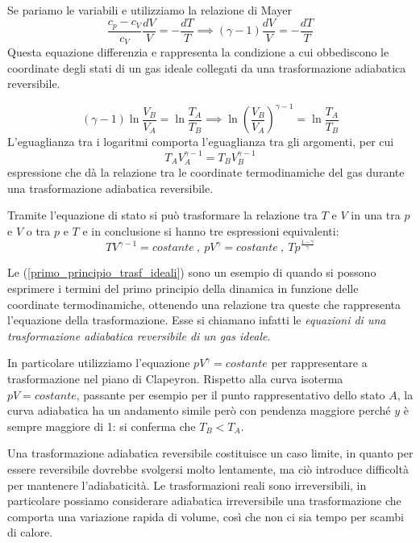 \documentclass[class=book, crop=false, oneside, 12pt]{standalone}
\begin{document}
Se pariamo le variabili e utilizziamo la relazione di Mayer
\begin{equation*}
    \frac{c_p -c_V}{c_V} \frac{d V}{V} = - \frac{d T}{T} \implies (\gamma - 1) \frac{d V}{V} = - \frac{d T}{T}
\end{equation*}
Questa equazione differenzia e rappresenta la condizione a cui obbediscono le coordinate degli stati di un gas ideale collegati da una trasformazione adiabatica reversibile.

\begin{equation*}
    (\gamma - 1) \ln \frac{V_{B}}{V_A} = \ln \frac{T_A}{T_B} \implies \ln \left(\frac{V_B}{V_A}\right)^{\gamma - 1 } = \ln \frac{T_A}{T_B}
\end{equation*}
L'eguaglianza tra i logaritmi comporta l'eguaglianza tra gli argomenti, per cui
\begin{equation*}
    T_A V_A^{\gamma - 1} = T_B V_B^{\gamma - 1}
\end{equation*}
espressione che dà la relazione tra le coordinate termodinamiche del gas durante una trasformazione adiabatica reversibile. 

Tramite l'equazione di stato si può trasformare la relazione tra \(T\) e \(V\) in una tra \(p\) e \(V\) o tra \(p\) e \(T\) e in conclusione si hanno tre espressioni equivalenti:
\begin{equation}
    T V^{\gamma - 1 } = costante \ , \ pV^{\gamma} = costante \ , \ T p^{\frac{1 - \gamma}{\gamma}}
\end{equation}

Le (\ref{primo_principio_trasf_ideali}) sono un esempio di quando si possono esprimere i termini del primo principio della dinamica in funzione delle coordinate termodinamiche, ottenendo una relazione tra queste che rappresenta l'equazione della trasformazione.
Esse si chiamano infatti le \emph{equazioni di una trasformazione adiabatica reversibile di un gas ideale}.

In particolare utilizziamo l'equazione \(p V^{\gamma} = costante\) per rappresentare a trasformazione nel piano di Clapeyron. 
Rispetto alla curva isoterma \(p V = costante\), passante per esempio per il punto rappresentativo dello stato \(A\), la curva adiabatica ha un andamento simile però con pendenza maggiore perché \(y\) è sempre maggiore di 1:  si conferma che \(T_B < T_A\).

Una trasformazione adiabatica reversibile costituisce un caso limite, in quanto per essere reversibile dovrebbe svolgersi molto lentamente, ma ciò introduce difficoltà per mantenere l'adiabaticità. 
Le trasformazioni reali sono irreversibili, in particolare possiamo considerare adiabatica irreversibile una trasformazione che comporta una variazione rapida di volume, così che non ci sia tempo per scambi di calore. 
\end{document}
